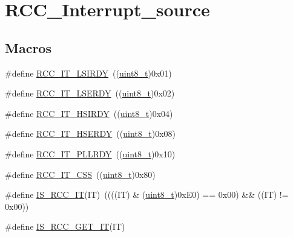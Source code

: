 \hypertarget{group___r_c_c___interrupt__source}{}\section{R\+C\+C\+\_\+\+Interrupt\+\_\+source}
\label{group___r_c_c___interrupt__source}
\subsection*{Macros}
\begin{DoxyCompactItemize}
\item 
\#define \hyperlink{group___r_c_c___interrupt__source_ga2b4ef277c1b71f96e0bef4b9a72fca94}{R\+C\+C\+\_\+\+I\+T\+\_\+\+L\+S\+I\+R\+DY}~((\hyperlink{_p_e___types_8h_aba7bc1797add20fe3efdf37ced1182c5}{uint8\+\_\+t})0x01)
\item 
\#define \hyperlink{group___r_c_c___interrupt__source_gad6b6e78a426850f595ef180d292a673d}{R\+C\+C\+\_\+\+I\+T\+\_\+\+L\+S\+E\+R\+DY}~((\hyperlink{_p_e___types_8h_aba7bc1797add20fe3efdf37ced1182c5}{uint8\+\_\+t})0x02)
\item 
\#define \hyperlink{group___r_c_c___interrupt__source_ga69637e51b71f73f519c8c0a0613d042f}{R\+C\+C\+\_\+\+I\+T\+\_\+\+H\+S\+I\+R\+DY}~((\hyperlink{_p_e___types_8h_aba7bc1797add20fe3efdf37ced1182c5}{uint8\+\_\+t})0x04)
\item 
\#define \hyperlink{group___r_c_c___interrupt__source_gad13eaede352bca59611e6cae68665866}{R\+C\+C\+\_\+\+I\+T\+\_\+\+H\+S\+E\+R\+DY}~((\hyperlink{_p_e___types_8h_aba7bc1797add20fe3efdf37ced1182c5}{uint8\+\_\+t})0x08)
\item 
\#define \hyperlink{group___r_c_c___interrupt__source_ga68d48e7811fb58f2649dce6cf0d823d9}{R\+C\+C\+\_\+\+I\+T\+\_\+\+P\+L\+L\+R\+DY}~((\hyperlink{_p_e___types_8h_aba7bc1797add20fe3efdf37ced1182c5}{uint8\+\_\+t})0x10)
\item 
\#define \hyperlink{group___r_c_c___interrupt__source_ga9bb34a4912d2084dc1c0834eb53aa7a3}{R\+C\+C\+\_\+\+I\+T\+\_\+\+C\+SS}~((\hyperlink{_p_e___types_8h_aba7bc1797add20fe3efdf37ced1182c5}{uint8\+\_\+t})0x80)
\item 
\#define \hyperlink{group___r_c_c___interrupt__source_ga710d72ccf88ddbec09b033c81a571a83}{I\+S\+\_\+\+R\+C\+C\+\_\+\+IT}(IT)~((((IT) \& (\hyperlink{_p_e___types_8h_aba7bc1797add20fe3efdf37ced1182c5}{uint8\+\_\+t})0x\+E0) == 0x00) \&\& ((\+I\+T) != 0x00))
\item 
\#define \hyperlink{group___r_c_c___interrupt__source_ga7a1b771d6d9c2d8346ab58a1f046f6a6}{I\+S\+\_\+\+R\+C\+C\+\_\+\+G\+E\+T\+\_\+\+IT}(IT)

\end{DoxyCompactItemize}
